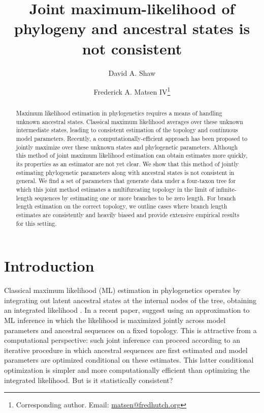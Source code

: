 \documentclass[11pt]{article}
\title{Joint maximum-likelihood of phylogeny and ancestral states is not consistent}
\author[1]{David A. Shaw}
\author[1]{Frederick A. Matsen IV\thanks{Corresponding author. Email: \url{matsen@fredhutch.org}}}
\affil[1]{Computational Biology Program, Fred Hutchinson Cancer Research Center\\ Seattle, WA, USA}
\date{}
\begin{document}
\renewcommand{\arraystretch}{1.2} %

\maketitle

\begin{abstract}
Maximum likelihood estimation in phylogenetics requires a means of handling unknown ancestral states.
Classical maximum likelihood averages over these unknown intermediate states, leading to consistent estimation of the topology and continuous model parameters.
Recently, a computationally-efficient approach has been proposed to jointly maximize over these unknown states and phylogenetic parameters.
Although this method of joint maximum likelihood estimation can obtain estimates more quickly, its properties as an estimator are not yet clear.
We show that this method of jointly estimating phylogenetic parameters along with ancestral states is not consistent in general.
We find a set of parameters that generate data under a four-taxon tree for which this joint method estimates a multifurcating topology in the limit of infinite-length sequences by estimating one or more branches to be zero length.
For branch length estimation on the correct topology, we outline cases where branch length estimates are consistently and heavily biased and provide extensive empirical results for this setting.
\end{abstract}

\newpage

\section*{Introduction}

Classical maximum likelihood (ML) estimation in phylogenetics operates by integrating out latent ancestral states at the internal nodes of the tree, obtaining an integrated likelihood \citep{Goldman1990-dk}.
In a recent paper, \citet{Sagulenko2018-xl} suggest using an approximation to ML inference in which the likelihood is maximized jointly across model parameters and ancestral sequences on a fixed topology.
This is attractive from a computational perspective: such joint inference can proceed according to an iterative procedure in which ancestral sequences are first estimated and model parameters are optimized conditional on these estimates.
This latter conditional optimization is simpler and more computationally efficient than optimizing the integrated likelihood.
But is it statistically consistent?
\end{document}
